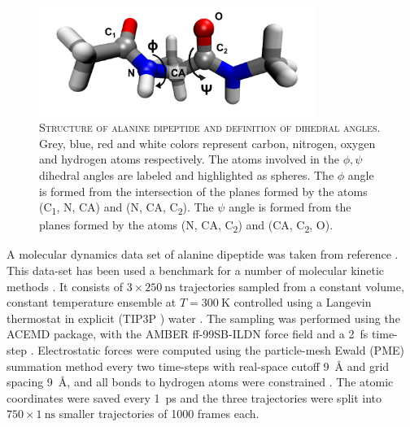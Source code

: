 \begin{figure}
    \centering
    \includegraphics[width=0.8\textwidth]{chapters/msm_optimization/figures/phi_psi_ala-dp.png}
    \caption[Structure of alanine dipeptide and definition of dihedral angles]{\textsc{Structure of alanine dipeptide and definition of dihedral angles}. Grey, blue, red and white colors represent carbon, nitrogen, oxygen and hydrogen atoms respectively. The atoms involved in the $\phi, \psi$ dihedral angles are labeled and highlighted as spheres.  The $\phi$ angle is formed from the intersection of the planes formed by the atoms (C\textsubscript{1}, N, CA) and (N, CA, C\textsubscript{2}).  The $\psi$ angle is formed from the planes formed by the atoms (N, CA, C\textsubscript{2}) and (CA, C\textsubscript{2}, O).}
    \label{fig:ala1_structure}
\end{figure}

A molecular dynamics data set  of alanine dipeptide was taken from reference \cite{nuskeMarkovStateModels2017b}. This data-set has been used a benchmark for a number of molecular kinetic methods \cite{wehmeyerTimelaggedAutoencodersDeep2018a, nuskeMarkovStateModels2017b, nuskeCoarsegrainingMolecularSystems2019, wangMachineLearningCoarseGrained2019, liNeuralCanonicalTransformation2020, varolgunesInterpretableEmbeddingsMolecular2020, nuskeSpectralPropertiesEffective2021, sechiEstimationKoopmanGenerator2021, mardtVAMPnetsDeepLearning2018}. It consists of $3\times \SI{250}{\nano\second}$ trajectories sampled from a constant volume, constant temperature ensemble at $T=\SI{300}{\kelvin}$ controlled using a Langevin thermostat in explicit (TIP3P \cite{jorgensen1983comparison}) water \cite{nuskeMarkovStateModels2017b}. The sampling was performed using the ACEMD \cite{harveyACEMDAcceleratingBiomolecular2009} package, with the AMBER ff-99SB-ILDN \cite{lindorff-larsenImprovedSidechainTorsion2010} force field and a \SI{2}{\femto\second} time-step \cite{nuskeMarkovStateModels2017b}. Electrostatic forces were computed using the particle-mesh Ewald (PME) \cite{dardenParticleMeshEwald1993} summation method every two time-steps with  real-space cutoff \SI{9}{\angstrom} and grid spacing \SI{9}{\angstrom}, and all bonds to hydrogen atoms were constrained \cite{nuskeMarkovStateModels2017b}. The atomic coordinates were saved every \SI{1}{\pico\second} and the three trajectories were split into $750\times\SI{1}{\nano\second}$ smaller trajectories of \num{1000} frames each. 



